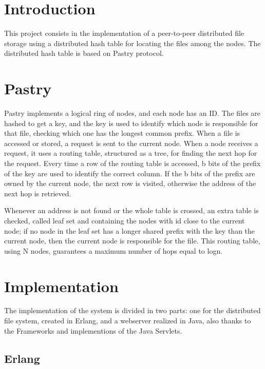 \documentclass{article}
\begin{document}
\tableofcontents
\newpage

\section{Introduction}

This project consists in the implementation of a peer-to-peer distributed 
file storage using a distributed hash table for locating the files among the nodes. 
The distributed hash table is based on Pastry protocol.

\section{Pastry}

Pastry implements a logical ring of nodes, and each node has an ID. The files are hashed to get a key, 
and the key is used to identify which node is responsible for that file, 
checking which one has the longest common prefix. 
When a file is accessed or stored, a request is sent to the current node. 
When a node receives a request, it uses a routing table, structured as a tree, 
for finding the next hop for the request. Every time a row of the routing table is accessed, 
b bits of the prefix of the key are used to identify the correct column. If the b bits of the 
prefix are owned by the current node, the next row is visited, 
otherwise the address of the next hop is retrieved.


Whenever an address is not found or the whole table is crossed, an extra table is checked, 
called leaf set and containing the nodes with id close to the current node; 
if no node in the leaf set has a longer shared prefix with the key than the current node, 
then the current node is responsible for the file. 
This routing table, using N nodes, guarantees a maximum number of hops equal to logn.

\section{Implementation}

The implementation of the system is divided in two parts: one for the distributed file system, 
created in Erlang, and a webserver realized in Java, also thanks to the Frameworks and implementions of the Java Servlets.

\subsection{Erlang}
\end{document}
